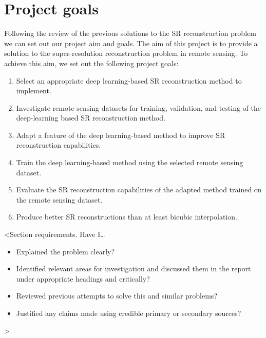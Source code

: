 \section{Project goals}
Following the review of the previous solutions to the SR reconstruction problem we can set out our project aim and goals. The aim of this project is to provide a solution to the super-resolution reconstruction problem in remote sensing. To achieve this aim, we set out the following project goals:
\begin{enumerate}
    \item Select an appropriate deep learning-based SR reconstruction method to implement.
    \item Investigate remote sensing datasets for training, validation, and testing of the deep-learning based SR reconstruction method.
    \item Adapt a feature of the deep learning-based method to improve SR reconstruction capabilities.
    \item Train the deep learning-based method using the selected remote sensing dataset.
    \item Evaluate the SR reconstruction capabilities of the adapted method trained on the remote sensing dataset.
    \item Produce better SR reconstructions than at least bicubic interpolation.
\end{enumerate}

<Section requirements. Have I\dots
\begin{itemize}
    \item Explained the problem clearly?
    \item Identified relevant areas for investigation and discussed them in the report under appropriate headings and critically?
    \item Reviewed previous attempts to solve this and similar problems?
    \item Justified any claims made using credible primary or secondary sources?
\end{itemize}
>